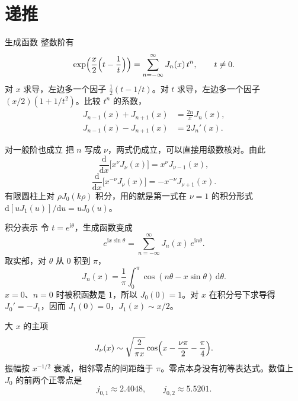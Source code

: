 \documentclass[fontset=windows, chinese, 10pt, xcolor=dvipsnames]{beamer}
\begin{document}
\section{递推}

\begin{frame}{生成函数}
  整数阶有
  \begin{equation*}
    \exp\Bigl(\frac{x}{2}\Bigl(t-\frac{1}{t}\Bigr)\Bigr)
    =\sum_{n=-\infty}^{\infty} J_n(x)\,t^n,
    \qquad t\neq 0.
  \end{equation*}
  对 $x$ 求导，左边多一个因子 $\frac12(t-1/t)$。对 $t$ 求导，左边多一个因子 $(x/2)(1+1/t^2)$。比较 $t^n$ 的系数，
  \begin{align*}
    J_{n-1}(x)+J_{n+1}(x)&=\frac{2n}{x}J_n(x),\\
    J_{n-1}(x)-J_{n+1}(x)&=2J_n'(x).
  \end{align*}
\end{frame}

\begin{frame}{对一般阶也成立}
  把 $n$ 写成 $\nu$，两式仍成立，可以直接用级数核对。由此
  \begin{equation*}
    \frac{\mathrm{d}}{\mathrm{d}x}\bigl[x^{\nu}J_{\nu}(x)\bigr]
    =x^{\nu}J_{\nu-1}(x),
  \end{equation*}
  \[
    \frac{\mathrm{d}}{\mathrm{d}x}\bigl[x^{-\nu}J_{\nu}(x)\bigr]
    =-x^{-\nu}J_{\nu+1}(x).
  \]
  有限圆柱上对 $\rho J_0(k\rho)$ 积分，用的就是第一式在 $\nu=1$ 的积分形式 $\mathrm{d}[u J_1(u)]/\mathrm{d}u=u J_0(u)$。
\end{frame}

\begin{frame}{积分表示}
  令 $t=e^{\mathrm{i}\theta}$，生成函数变成
  \[
    e^{\mathrm{i}x\sin\theta}
    =\sum_{n=-\infty}^{\infty} J_n(x)\,e^{\mathrm{i}n\theta}.
  \]
  取实部，对 $\theta$ 从 $0$ 积到 $\pi$，
  \[
    J_n(x)
    =\frac{1}{\pi}\int_0^{\pi}
      \cos(n\theta-x\sin\theta)\,\mathrm{d}\theta.
  \]
  $x=0$、$n=0$ 时被积函数是 $1$，所以 $J_0(0)=1$。对 $x$ 在积分号下求导得 $J_0'=-J_1$，因而 $J_1(0)=0$，$J_1(x)\sim x/2$。
\end{frame}

\begin{frame}{大 $x$ 的主项}
  \[
    J_{\nu}(x)
    \sim\sqrt{\frac{2}{\pi x}}
      \cos\Bigl(x-\frac{\nu\pi}{2}-\frac{\pi}{4}\Bigr).
  \]
  振幅按 $x^{-1/2}$ 衰减，相邻零点的间距趋于 $\pi$。零点本身没有初等表达式。数值上 $J_0$ 的前两个正零点是
  \[
    j_{0,1}\approx 2.4048,
    \qquad
    j_{0,2}\approx 5.5201.
  \]
\end{frame}
\end{document}
